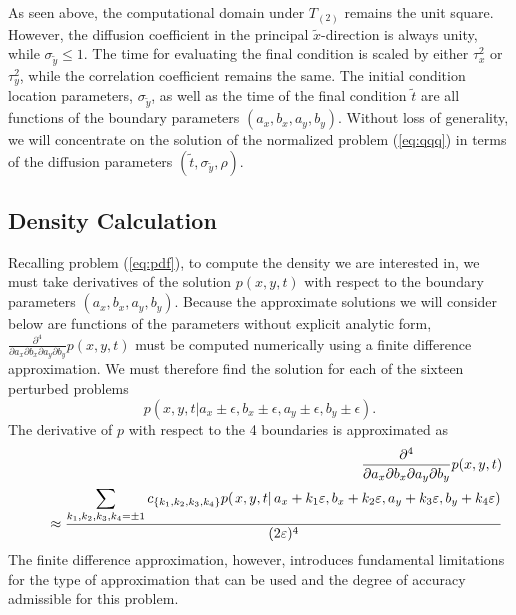 As seen above, the computational domain under $T_{(2)}$ remains the
unit square. However, the diffusion coefficient in the principal
$\tilde{x}$-direction is always unity, while
$\sigma_{\tilde{y}} \leq 1$. The time for evaluating the final
condition is scaled by either $\tau_x^2$ or $\tau_y^2$, while the
correlation coefficient remains the same. The initial condition
location parameters, $\sigma_{\tilde{y}}$, as well as the time of the
final condition $\tilde{t}$ are all functions of the boundary
parameters $(a_x, b_x, a_y, b_y)$. Without loss of generality, we will
concentrate on the solution of the normalized problem (\ref{eq:qqq})
in terms of the diffusion parameters
$(\tilde{t}, \sigma_{\tilde{y}}, \rho)$.

\subsection{Density Calculation} \label{sec:likelihood-calc}
Recalling problem (\ref{eq:pdf}), to compute the density we are
interested in, we must take derivatives of the solution $p(x,y,t)$
with respect to the boundary parameters $(a_x, b_x, a_y,
b_y)$. Because the approximate solutions we will consider below are
functions of the parameters without explicit analytic form,
$\frac{\partial^4}{\partial a_x\partial b_x \partial a_y \partial
  b_y}p(x,y,t)$ must be computed numerically using a finite difference
approximation. We must therefore find the solution for each of the
sixteen perturbed problems
\[
  p(x,y,t | a_x \pm \epsilon, b_x \pm \epsilon, a_y \pm \epsilon, b_y
  \pm \epsilon).
\]
The derivative of $p$ with respect to the 4 boundaries is approximated
as
\begin{eqnarray*}
& & \frac{\partial^4}{\partial a_x \partial b_x \partial a_y \partial b_y} p(x, y, t) 
\nonumber \\
& & \hspace*{0.5cm} \approx \frac{\displaystyle \sum_{k_1, k_2, k_3, k_4 = \pm 1}
c_{\{ k_1, k_2, k_3, k_4 \} } p(\left. x, y, t \right| a_x+k_1 \varepsilon, b_x+k_2 \varepsilon, 
a_y+k_3 \varepsilon, b_y+k_4 \varepsilon) }{(2 \varepsilon )^4} 
\nonumber
\end{eqnarray*}
The finite difference approximation, however, introduces fundamental
limitations for the type of approximation that can be used and the
degree of accuracy admissible for this problem.

